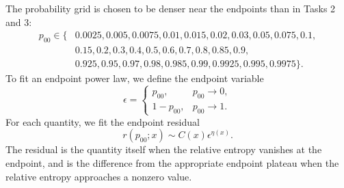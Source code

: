 \documentclass{article}
\theoremstyle{plain}
\theoremstyle{definition}
\theoremstyle{plain}
\begin{document}
The probability grid is chosen to be denser near the endpoints than in Tasks 2 and 3:
\begin{equation}
\begin{aligned}
p_{00}\in\{&
0.0025,0.005,0.0075,0.01,0.015,0.02,0.03,0.05,0.075,0.1,\\
&0.15,0.2,0.3,0.4,0.5,0.6,0.7,0.8,0.85,0.9,\\
&0.925,0.95,0.97,0.98,0.985,0.99,0.9925,0.995,0.9975\}.
\end{aligned}
\end{equation}
To fit an endpoint power law, we define the endpoint variable
\begin{equation}
    \epsilon =
    \begin{cases}
        p_{00}, & p_{00}\rightarrow 0,\\
        1-p_{00}, & p_{00}\rightarrow 1.
    \end{cases}
\end{equation}
For each quantity, we fit the endpoint residual
\begin{equation}
    r(p_{00};x)\sim C(x)\epsilon^{\eta(x)}.
\end{equation}
The residual is the quantity itself when the relative entropy vanishes at the endpoint, and is the
difference from the appropriate endpoint plateau when the relative entropy approaches a nonzero value.
\end{document}
